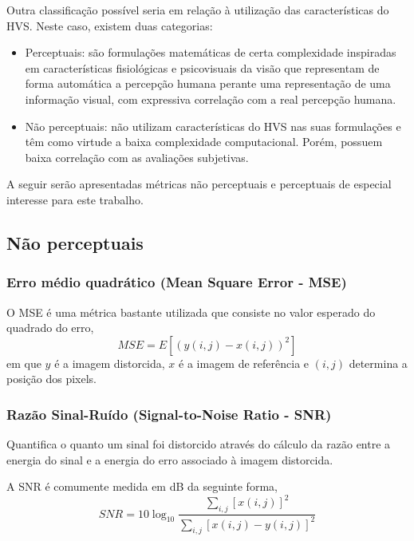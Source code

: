 Outra classificação possível seria em relação à utilização das características do HVS. Neste caso, existem duas categorias:

\begin{itemize}
\item Perceptuais: são formulações matemáticas de certa complexidade inspiradas em
características fisiológicas e psicovisuais da visão que representam de forma automática a percepção humana perante uma representação de uma informação visual, com expressiva correlação com a real percepção humana.
\item Não perceptuais: não utilizam características do HVS nas suas formulações e têm como virtude a baixa
complexidade computacional. Porém, possuem baixa correlação com as avaliações subjetivas.
\end{itemize}

A seguir serão apresentadas métricas não perceptuais e perceptuais de especial interesse para este trabalho.

\subsection{Não perceptuais}
\label{nao_percep}

\subsubsection{Erro médio quadrático (Mean Square Error - MSE)}
\label{mse}

O MSE é uma métrica bastante utilizada que consiste no valor esperado do quadrado do erro,
\begin{equation}
MSE = E \left[ (y(i,j) - x(i,j))^2 \right]
\end{equation}
em que $ y $ é a imagem distorcida, $ x $ é a imagem de referência e $ (i,j) $ determina a posição dos pixels.
\subsubsection{Razão Sinal-Ruído (Signal-to-Noise Ratio - SNR)}
\label{snr}

Quantifica o quanto um sinal foi distorcido através do cálculo da razão entre a energia do sinal e a energia do erro associado à imagem distorcida.


A SNR é comumente medida em dB da seguinte forma,
\begin{equation}
SNR = 10\log_{10}{\frac{\sum_{i,j}[x(i,j)]^2}{\sum_{i,j}[x(i,j)-y(i,j)]^2}}
\end{equation}

